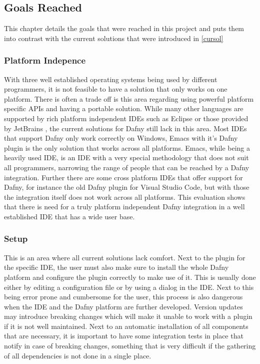 \subsection{Goals Reached}
This chapter details the goals that were reached in this project and puts them into contrast with the current solutions that were introduced in \ref{cursol}
\subsubsection{Platform Indepence}
With three well established operating systems being used by different programmers, it is not feasible to have a solution that only works on one platform. There is often a trade off is this area regarding using powerful platform specific APIs and having a portable solution. While many other languages are supported by rich platform independent IDEs such as Eclipse \cite{eclipse} or those provided by JetBrains \cite{jetbrains}, the current solutions for Dafny still lack in this area. \newline
Most IDEs that support Dafny only work correctly on Windows, Emacs \cite{GNU} with it's Dafny plugin is the only solution that works across all platforms. Emacs, while being a heavily used IDE, is an IDE with a very special methodology that does not suit all programmers, narrowing the range of people that can be reached by a Dafny integration. Further there are some cross platform IDEs that offer support for Dafny, for instance the old Dafny plugin for Visual Studio Code, but with those the integration itself does not work across all platforms. \newline
This evaluation shows that there is need for a truly platform independent Dafny integration in a well established IDE that has a wide user base. \newline
\subsubsection{Setup}
This is an area where all current solutions lack comfort. Next to the plugin for the specific IDE, the user must also make sure to install the whole Dafny platform and configure the plugin correctly to make use of it. This is usually done either by editing a configuration file or by using a dialog in the IDE. Next to this being error prone and cumbersome for the user, this process is also dangerous when the IDE and the Dafny platform are further developed. Version updates may introduce breaking changes which will make it unable to work with a plugin if it is not well maintained. \newline
Next to an automatic installation of all components that are necessary, it is important to have some integration tests in place that notify in case of breaking changes, something that is very difficult if the gathering of all dependencies is not done in a single place. \newline

